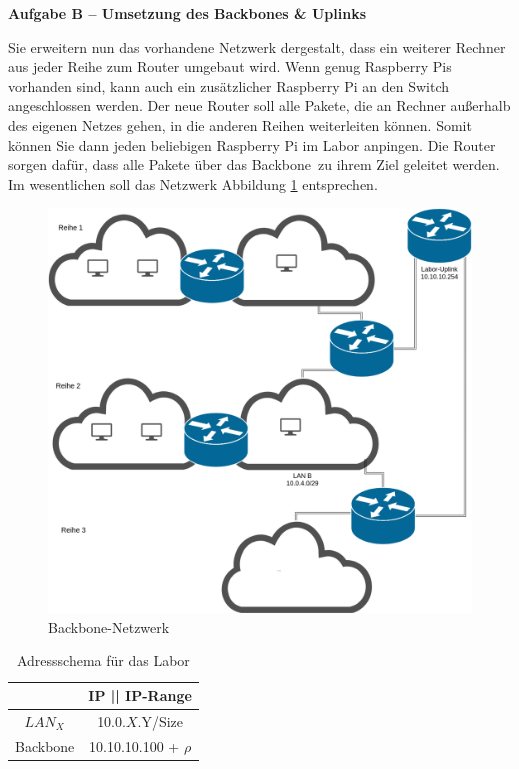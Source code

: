 \documentclass[paper=a4,fontsize=11pt]{scrartcl}%
\numberwithin{equation}{section}
\begin{document}
\begin{enumerate}
\begin{center}\Large{\textbf{Aufgabe B -- Umsetzung des Backbones \& Uplinks}}\end{center}\vskip0.25in
Sie erweitern nun das vorhandene Netzwerk dergestalt, dass ein weiterer Rechner aus jeder Reihe zum Router umgebaut wird. Wenn genug Raspberry Pis vorhanden sind, kann auch ein zusätzlicher Raspberry Pi an den Switch angeschlossen werden. Der neue Router soll alle Pakete, die an Rechner außerhalb des eigenen Netzes gehen, in die anderen Reihen weiterleiten können. Somit können Sie dann jeden beliebigen Raspberry Pi im Labor anpingen. Die Router sorgen dafür, dass alle Pakete über das \glqq Backbone\grqq\ zu ihrem Ziel geleitet werden. Im wesentlichen soll das Netzwerk Abbildung \ref{backbone} entsprechen. 
\begin{figure}[H]
	\center
	\includegraphics[scale=0.2]{backbone}
	\caption{Backbone-Netzwerk}
	\label{backbone}
\end{figure}
\begin{table}[H]
\caption{Adressschema für das Labor}
\label{adress_scheme}
\centering
\begin{tabular}{|c|c|}\hline
 & \textbf{IP  || IP-Range} \\ \hline
 $LAN_X$ & 10.0.$X$.Y/Size \\ \hline
 Backbone & 10.10.10.100 + $\rho$ \\ \hline

\end{tabular}
\end{table}
\end{enumerate}
\end{document}
